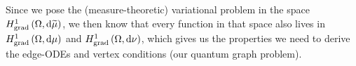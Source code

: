 Since we pose the (measure-theoretic) variational problem in the space $H^1_\mathrm{grad}\left( \Omega, \mathrm{d}\widetilde{\mu} \right)$, we then know that every function in that space also lives in $H^1_\mathrm{grad}\left( \Omega, \mathrm{d}\mu \right)$ and $H^1_\mathrm{grad}\left( \Omega, \mathrm{d}\nu \right)$, which gives us the properties we need to derive the edge-ODEs and vertex conditions (our quantum graph problem).